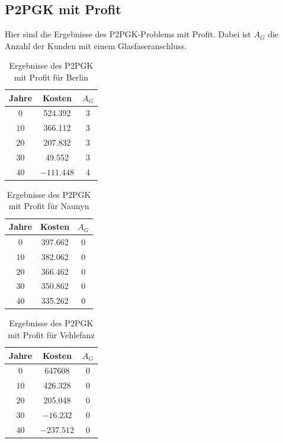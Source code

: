 \documentclass[11pt,a4paper]{article}
\theoremstyle{my_th_style1}
\begin{document}
\subsection*{P2PGK mit Profit}
Hier sind die Ergebnisse des P2PGK-Problems mit Profit. Dabei ist $A_G$ die Anzahl der Kunden mit einem Glasfaseranschluss.
\begin{table}[!htbp]
	\centering
	\begin{tabular}{c|c|c}
		\centering
		Jahre & Kosten & $A_G$ \\	
		\hline
		$0$   	 &  524.392 & 3  \\
		$10$ 	&   366.112& 3  \\
		$20$   	&   207.832 & 3  \\
		$30$    &   49.552 & 3  \\
		$40$    & $-111.448$ & 4 \\
	\end{tabular}
	\label{P2PGKProfit}
	\caption{Ergebnisse des P2PGK mit Profit f\"ur Berlin} 
\end{table}

\begin{table}[!htbp]
	\centering
	\begin{tabular}{c|c|c}
		\centering
		Jahre & Kosten & $A_G$ \\	
		\hline
		$0$   	 &  397.662& 0  \\
		$10$ 	&  382.062 & 0  \\
		$20$   	&  366.462  & 0  \\
		$30$    &  350.862 & 0  \\
		$40$    &  335.262  & 0 \\
	\end{tabular}
	\label{P2PGKProfitN}
	\caption{Ergebnisse des P2PGK mit Profit f\"ur Naunyn} 
\end{table}

\begin{table}[!htbp]
	\centering
	\begin{tabular}{c|c|c}
		\centering
		Jahre & Kosten & $A_G$ \\	
		\hline
		$0$   	 & 647608  &0  \\
		$10$ 	&  426.328 & 0  \\
		$20$   	&  205.048  & 0  \\
		$30$    & $-16.232$& 0  \\
		$40$    &  $-237.512$ & 0 \\
	\end{tabular}
	\label{P2PGKProfitV}
	\caption{Ergebnisse des P2PGK mit Profit f\"ur Vehlefanz} 
\end{table}
\vspace{3cm}
\end{document}
